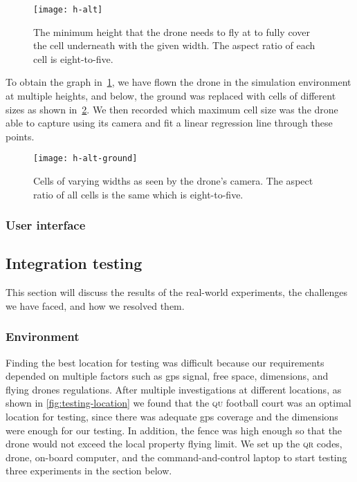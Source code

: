 \documentclass[../main.tex]{subfiles}
\begin{document}
\begin{figure}[tbp]
	\centering
	\texttt{[image: h-alt]}
	\caption{The minimum height that the drone needs to fly at to
        fully cover the cell underneath with the given width.  
        The aspect ratio of each cell is eight-to-five.}
	\label{fig:h-alt}
\end{figure}

To obtain the graph in~\cref{fig:h-alt}, we have flown the drone in
the simulation environment at multiple heights, and below, the ground
was replaced with cells of different sizes as shown
in~\cref{fig:h-alt-ground}.
We then recorded which maximum cell size was the drone able to capture
using its camera and fit a linear regression line through these
points. 

\begin{figure}[tbp]
	\centering
	\texttt{[image: h-alt-ground]}
	\caption{Cells of varying widths as seen by the drone's camera.
        The aspect ratio of all cells is the same which is
        eight-to-five.}
	\label{fig:h-alt-ground}
\end{figure}

\subsubsection{User interface}

\lipsum[1]

\subsection{Integration testing}

This section will discuss the results of the 
real-world experiments, the challenges we have faced,
and how we resolved them.

\subsubsection{Environment}

Finding the best location for testing was difficult
because our requirements depended on multiple factors 
such as \gls{gps} signal, free space, dimensions,
and flying drones regulations. After multiple investigations
at different locations, as shown in \cref{fig:testing-location}
we found that the \textsc{qu} football court was an optimal location
for testing, since there was adequate \gls{gps} coverage and the
dimensions were enough for our testing. 
In addition, the fence was high enough so that
the drone would not exceed the local property flying limit.
We set up the \textsc{qr} codes, drone, on-board computer, and the
command-and-control laptop to start testing three experiments in the
section below.
\end{document}
